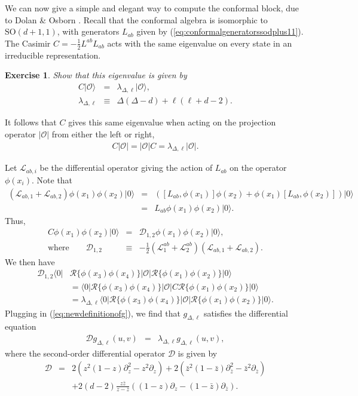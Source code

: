 \documentclass[11pt]{ws-rv9x6}
\newcommand\be{\begin{eqnarray}}
\newcommand\ee{\end{eqnarray}}
\newcommand\f\phi
\newcommand\cO{\mathcal{O}}
\newcommand\p[1]{\left(#1\right)}
\newcommand\ptl\partial
\newcommand\<\langle
\renewcommand\>\rangle
\newcommand\nn{\nonumber}
\renewcommand\.{\cdot}
\newcommand\SO{\mathrm{SO}}
\newcommand\De{\Delta}
\renewcommand\l\lambda
\newcommand\cL{\mathcal{L}}
\newcommand\cD{\mathcal{D}}
\newtheorem{exercise}{Exercise}[section]
\begin{document}
We can now give a simple and elegant way to compute the conformal block, due to Dolan \& Osborn \cite{DO2}.
Recall that the conformal algebra is isomorphic to $\SO(d+1,1)$, with generators $L_{ab}$ given by (\ref{eq:conformalgeneratorssodplus11}).  The Casimir $C=-\frac 1 2 L^{ab}L_{ab}$ acts with the same eigenvalue on every state in an irreducible representation.  
\begin{exercise}
Show that this eigenvalue is given by
\be
C|\cO\> &=& \l_{\De,\ell}|\cO\>,\nn\\
\l_{\De,\ell} &\equiv& \De(\De-d)+\ell(\ell+d-2).
\ee
\end{exercise}
It follows that $C$ gives this same eigenvalue when acting on the projection operator $|\cO|$ from either the left or right,
\be
C|\cO|=|\cO| C = \l_{\De,\ell}|\cO|.
\ee

Let $\cL_{ab,i}$ be the differential operator giving the action of $L_{ab}$ on the operator $\f(x_i)$.  Note that
\be
(\cL_{ab,1}+\cL_{ab,2})\f(x_1)\f(x_2)|0\> &=& \p{[L_{ab},\f(x_1)]\f(x_2)+\f(x_1)[L_{ab},\f(x_2)]}|0\>\nn\\
&=& L_{ab}\f(x_1)\f(x_2)|0\>.
\ee
Thus, 
\be
C\f(x_1)\f(x_2)|0\> &=& \cD_{1,2}\f(x_1)\f(x_2)|0\>,\nn\\
\textrm{where}\qquad\cD_{1,2} &\equiv& -\frac 1 2(\cL^{ab}_{1}+\cL^{ab}_{2})(\cL_{ab,1}+\cL_{ab,2}).
\ee
We then have
\begin{align}
\cD_{1,2}\<0|&\mathcal{R}\{\f(x_3)\f(x_4)\}|\cO|\mathcal{R}\{\f(x_1)\f(x_2)\}|0\>\nn\\
&=
\<0|\mathcal{R}\{\f(x_3)\f(x_4)\}|\cO| C\mathcal{R}\{\f(x_1)\f(x_2)\}|0\>\nn\\
&= \l_{\De,\ell}\<0|\mathcal{R}\{\f(x_3)\f(x_4)\}|\cO|\mathcal{R}\{\f(x_1)\f(x_2)\}|0\>.
\end{align}
Plugging in (\ref{eq:newdefinitionofg}), we find that $g_{\De,\ell}$ satisfies the differential equation 
\be
\label{eq:conformalcasimir}
\cD g_{\De,\ell}(u,v) &=& \l_{\De,\ell} g_{\De,\ell}(u,v),
\ee
where the second-order differential operator $\cD$ is given by
\be
\cD &=& 2(z^2(1-z)\ptl_z^2-z^2 \ptl_z) + 2(\bar z^2 (1-\bar z)\ptl_{\bar z}^2-\bar z^2 \ptl_{\bar z})\nn\\
&& + 2(d-2)\frac{z\bar z}{z-\bar z}((1-z)\ptl_z - (1-\bar z)\ptl_{\bar z}).
\ee
\end{document}
